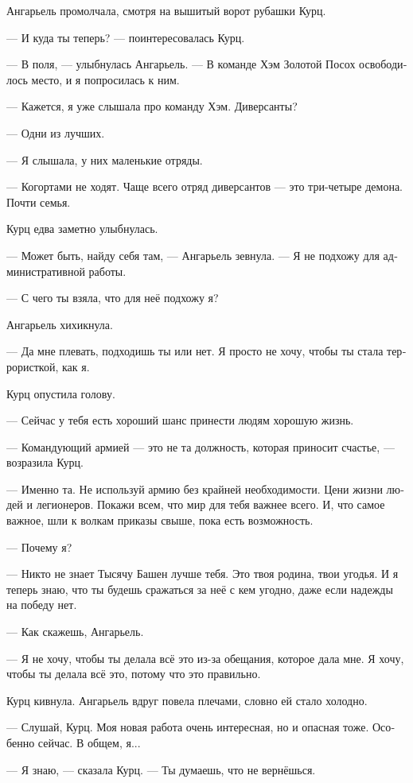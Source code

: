 \documentclass[a4paper,12pt,fleqn]{book}\usepackage{cooltooltips}\usepackage{polyglossia}\setdefaultlanguage[babelshorthands=true]{russian}\setotherlanguage{english}\defaultfontfeatures{Ligatures=TeX,Mapping=tex-text} \usepackage{xcolor}\definecolor{lightgray}{HTML}{bbbbbb}\color{lightgray}\newcommand{\ml}[3]{\textenglish{\textcolor{black}{#3}}}
\begin{document}
Ангарьель промолчала, смотря на вышитый ворот рубашки Курц.

--- И куда ты теперь? --- поинтересовалась Курц.

--- В поля, --- улыбнулась Ангарьель.
--- В команде Хэм Золотой Посох освободилось место, и я попросилась к ним.

--- Кажется, я уже слышала про команду Хэм.
Диверсанты?

--- Одни из лучших.

--- Я слышала, у них маленькие отряды.

--- Когортами не ходят.
Чаще всего отряд диверсантов --- это три-четыре демона.
Почти семья.

Курц едва заметно улыбнулась.

--- Может быть, найду себя там, --- Ангарьель зевнула.
--- Я не подхожу для административной работы.

--- С чего ты взяла, что для неё подхожу я?

Ангарьель хихикнула.

--- Да мне плевать, подходишь ты или нет.
Я просто не хочу, чтобы ты стала террористкой, как я.

Курц опустила голову.

--- Сейчас у тебя есть хороший шанс принести людям хорошую жизнь.

--- Командующий армией --- это не та должность, которая приносит счастье, --- возразила Курц.

--- Именно та.
Не используй армию без крайней необходимости.
Цени жизни людей и легионеров.
Покажи всем, что мир для тебя важнее всего.
И, что самое важное, шли к волкам приказы свыше, пока есть возможность.

--- Почему я?

--- Никто не знает Тысячу Башен лучше тебя.
Это твоя родина, твои угодья.
И я теперь знаю, что ты будешь сражаться за неё с кем угодно, даже если надежды на победу нет.

--- Как скажешь, Ангарьель.

--- Я не хочу, чтобы ты делала всё это из-за обещания, которое дала мне.
Я хочу, чтобы ты делала всё это, потому что это правильно.

Курц кивнула.
Ангарьель вдруг повела плечами, словно ей стало холодно.

--- Слушай, Курц.
Моя новая работа очень интересная, но и опасная тоже.
Особенно сейчас.
В общем, я...

--- Я знаю, --- сказала Курц.
--- Ты думаешь, что не вернёшься.
\end{document}
